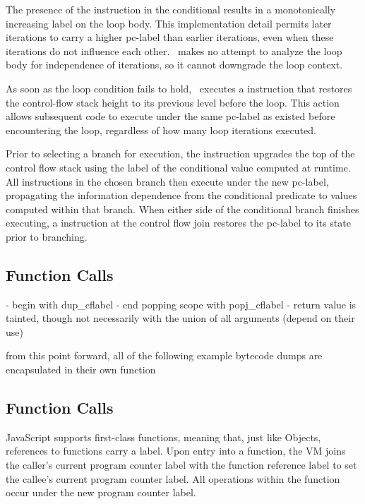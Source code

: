 The presence of the \join instruction in the conditional results in a monotonically increasing label on the loop body.
This implementation detail permits later iterations to carry a higher pc-label than earlier iterations, even when these iterations do not influence each other.
\FlowCore\ makes no attempt to analyze the loop body for independence of iterations, so it cannot downgrade the loop context.

As soon as the loop condition fails to hold, \FlowCore\ executes a \popj instruction that restores the control-flow stack height to its previous level before the loop.
This action allows subsequent code to execute under the same pc-label as existed before encountering the loop, regardless of how many loop iterations executed.


Prior to selecting a branch for execution, the \join instruction upgrades the top of the control flow stack using the label of the conditional value computed at runtime.
All instructions in the chosen branch then execute under the new pc-label, propagating the information dependence from the conditional predicate to values computed within that branch.
When either side of the conditional branch finishes executing, a \popj instruction at the control flow join restores the pc-label to its state prior to branching.


\subsection{Function Calls}

- begin with dup\_cflabel
- end popping scope with popj\_cflabel
- return value is tainted, though not necessarily with the union of all arguments (depend on their use)

from this point forward, all of the following example bytecode dumps are encapsulated in their own function




\subsection{Function Calls}

JavaScript supports first-class functions, meaning that, just like Objects, references to functions carry a label.
Upon entry into a function, the VM joins the caller's current program counter label with the function reference label to set the callee's current program counter label.
All operations within the function occur under the new program counter label.

